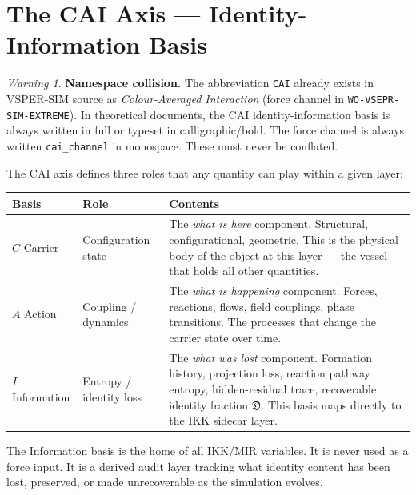 \documentclass[11pt, a4paper, oneside]{article}
\theoremstyle{definition}
\theoremstyle{plain}
\theoremstyle{remark}
\newtheorem{warning}{Warning}[section]
\newcommand{\Dfrak}{\mathfrak{D}}
\begin{document}
\section{The CAI Axis --- Identity-Information Basis}

\begin{warning}
  \textbf{Namespace collision.}
  The abbreviation \texttt{CAI} already exists in VSPER-SIM source as
  \emph{Colour-Averaged Interaction} (force channel in \texttt{WO-VSEPR-SIM-EXTREME}).
  In theoretical documents, the CAI identity-information basis is always written
  in full or typeset in calligraphic/bold. The force channel is always written
  \texttt{cai\_channel} in monospace. These must never be conflated.
\end{warning}

The CAI axis defines three roles that any quantity can play within a given layer:

\begin{longtable}{p{2.5cm} p{3.5cm} p{7cm}}
  \toprule
  \textbf{Basis} & \textbf{Role} & \textbf{Contents} \\
  \midrule
  \rowcolor{CarrierBG}
  $C$ \quad Carrier &
  Configuration state &
  The \emph{what is here} component. Structural, configurational, geometric.
  This is the physical body of the object at this layer --- the vessel
  that holds all other quantities. \\[4pt]
  \rowcolor{ActionBG}
  $A$ \quad Action &
  Coupling / dynamics &
  The \emph{what is happening} component. Forces, reactions, flows,
  field couplings, phase transitions. The processes that change the
  carrier state over time. \\[4pt]
  \rowcolor{InfoBG}
  $I$ \quad Information &
  Entropy / identity loss &
  The \emph{what was lost} component. Formation history, projection loss,
  reaction pathway entropy, hidden-residual trace, recoverable identity
  fraction $\Dfrak$. This basis maps directly to the IKK sidecar layer. \\
  \bottomrule
\end{longtable}

The Information basis is the home of all IKK/MIR variables. It is never
used as a force input. It is a derived audit layer tracking what identity
content has been lost, preserved, or made unrecoverable as the simulation evolves.
\end{document}
